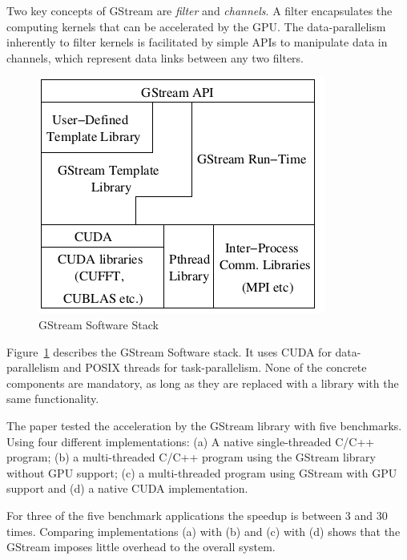 Two key concepts of GStream are \emph{filter} and \emph{channels}. A filter
encapsulates the computing kernels that can be accelerated by the GPU\@. The
data-parallelism inherently to filter kernels is facilitated by simple APIs to
manipulate data in channels, which represent data links between any two
filters.

\begin{figure}[!h]
	\centering
	\includegraphics[scale=0.6]{GStreamStack.png}
	\caption{GStream Software Stack}
	\label{fig:GStreamStack}
\end{figure}

Figure~\ref{fig:GStreamStack} describes the GStream Software stack.
It uses CUDA for data-parallelism and POSIX threads for task-parallelism. None
of the concrete components are mandatory, as long as they are replaced with a
library with the same functionality.

The paper tested the acceleration by the GStream library with five benchmarks.
Using four different implementations: (a) A native single-threaded C/C++
program; (b) a multi-threaded C/C++ program using the GStream library without
GPU support; (c) a multi-threaded program using GStream with GPU support and
(d) a native CUDA implementation.

For three of the five benchmark applications the speedup is between 3 and 30
times. Comparing implementations (a) with (b) and (c) with (d) shows that the
GStream imposes little overhead to the overall system.



